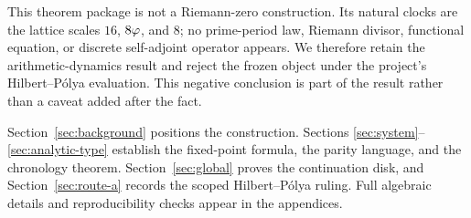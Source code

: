This theorem package is not a Riemann-zero construction.  Its natural clocks
are the lattice scales \(16\), \(8\varphi\), and \(8\); no prime-period law,
Riemann divisor, functional equation, or discrete self-adjoint operator
appears.  We therefore retain the arithmetic-dynamics result and reject the
frozen object under the project's Hilbert--P\'olya evaluation.  This negative
conclusion is part of the result rather than a caveat added after the fact.

Section~\ref{sec:background} positions the construction.  Sections
\ref{sec:system}--\ref{sec:analytic-type} establish the fixed-point formula,
the parity language, and the chronology theorem.  Section~\ref{sec:global}
proves the continuation disk, and Section~\ref{sec:route-a} records the scoped
Hilbert--P\'olya ruling.  Full algebraic details and reproducibility checks
appear in the appendices.

